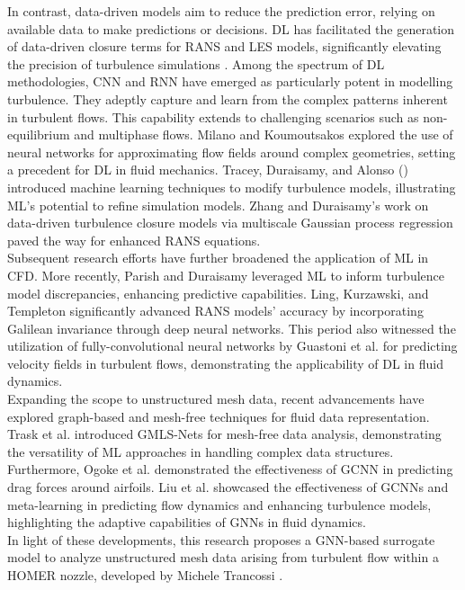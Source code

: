In contrast, data-driven models aim to reduce the prediction error, relying on available data to make predictions or decisions. DL has facilitated the generation of data-driven closure terms for RANS and LES models, significantly elevating the precision of turbulence simulations \cite{ling2016}. Among the spectrum of DL methodologies, \gls{CNN} and \gls{RNN} have emerged as particularly potent in modelling turbulence. They adeptly capture and learn from the complex patterns inherent in turbulent flows. This capability extends to challenging scenarios such as non-equilibrium and multiphase flows. Milano and Koumoutsakos \cite{milano2002} explored the use of neural networks for approximating flow fields around complex geometries, setting a precedent for DL in fluid mechanics. Tracey, Duraisamy, and Alonso (\cite{tracey2013}) introduced machine learning techniques to modify turbulence models, illustrating ML's potential to refine simulation models. Zhang and Duraisamy’s work \cite{zhang2015} on data-driven turbulence closure models via multiscale Gaussian process regression paved the way for enhanced RANS equations. \\
Subsequent research efforts have further broadened the application of ML in CFD.  More recently, Parish and Duraisamy \cite{parish2016} leveraged ML to inform turbulence model discrepancies, enhancing predictive capabilities. Ling, Kurzawski, and Templeton \cite{ling2016} significantly advanced RANS models' accuracy by incorporating Galilean invariance through deep neural networks. This period also witnessed the utilization of fully-convolutional neural networks by Guastoni et al. \cite{guastoni2020} for predicting velocity fields in turbulent flows, demonstrating the applicability of DL in fluid dynamics.\\
Expanding the scope to unstructured mesh data, recent advancements have explored graph-based and mesh-free techniques for fluid data representation. Trask et al. \cite{trask2019} introduced GMLS-Nets for mesh-free data analysis, demonstrating the versatility of ML approaches in handling complex data structures. Furthermore, Ogoke et al. \cite{ogoke2020} demonstrated the effectiveness of \gls{GCNN} in predicting drag forces around airfoils. Liu et al. \cite{metalearning} showcased the effectiveness of GCNNs and meta-learning in predicting flow dynamics and enhancing turbulence models, highlighting the adaptive capabilities of GNNs in fluid dynamics.\\
In light of these developments, this research proposes a GNN-based surrogate model to analyze unstructured mesh data arising from turbulent flow within a \gls{HOMER} nozzle, developed by Michele Trancossi \cite{trandum}.
